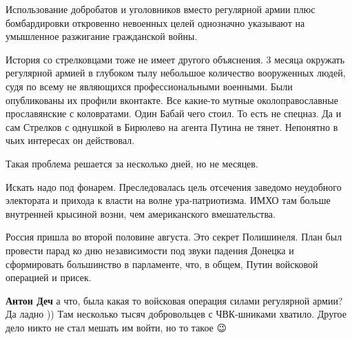 \begin{itemize}
\par
 

Использование добробатов и уголовников вместо регулярной армии плюс
бомбардировки откровенно невоенных целей однозначно указывают на умышленное
разжигание гражданской войны.

История со стрелковцами тоже не имеет другого объяснения. 3 месяца окружать
регулярной армией в глубоком тылу небольшое количество вооруженных людей, судя
по всему не являющихся профессиональными военными. Были опубликованы их профили
вконтакте. Все какие-то мутные околоправославные прославянские с коловратами.
Один Бабай чего стоил. То есть не спецназ. Да и сам Стрелков с однушкой в
Бирюлево на агента Путина не тянет. Непонятно в чьих интересах он действовал.

Такая проблема решается за несколько дней, но не месяцев.

Искать надо под фонарем. Преследовалась цель отсечения заведомо неудобного
электората и прихода к власти на волне ура-патриотизма. ИМХО там больше
внутренней крысиной возни, чем американского вмешательства.

Россия пришла во второй половине августа. Это секрет Полишинеля.  План был
провести парад ко дню независимости под звуки падения Донецка и сформировать
большинство в парламенте, что, в общем, Путин войсковой операцией и присек.

\begin{itemize}
 
\textbf{Антон Деч} а что, была какая то войсковая операция силами регулярной армии? Да ладно )) Там несколько тысяч добровольцев с ЧВК-шниками хватило. Другое дело никто не стал мешать им войти, но то такое 😉

 

\end{itemize}
\end{itemize}
